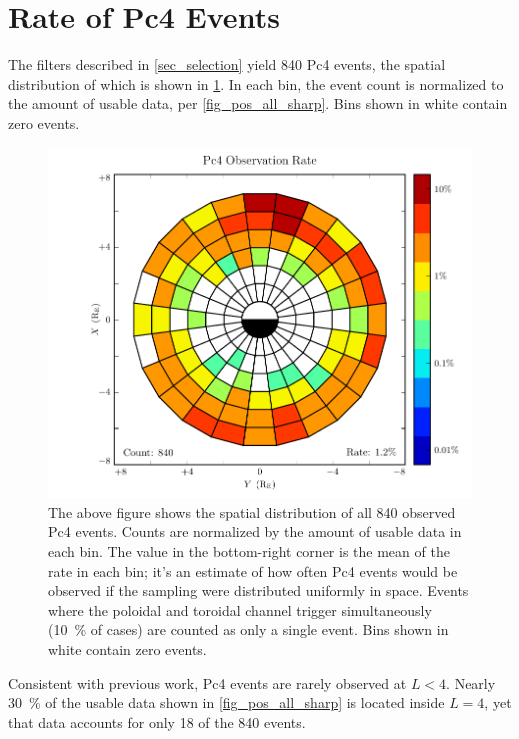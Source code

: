 \section{Rate of Pc4 Events}
  \label{sec_rate}

The filters described in \cref{sec_selection} yield 840 Pc4 events, the spatial distribution of which is shown in \cref{fig_rate_all_sharp}. In each bin, the event count is normalized to the amount of usable data, per \cref{fig_pos_all_sharp}. Bins shown in white contain zero events. 

\begin{figure}[!htb]
    \centering
    \includegraphics[width=\textwidth]{figures/rate_all_sharp.pdf}
    \caption[Observation Rate of Pc4 Events]{
      The above figure shows the spatial distribution of all 840 observed Pc4 events. Counts are normalized by the amount of usable data in each bin. The value in the bottom-right corner is the mean of the rate in each bin; it's an estimate of how often Pc4 events would be observed if the sampling were distributed uniformly in space. Events where the poloidal and toroidal channel trigger simultaneously (\about\SI{10}{\percent} of cases) are counted as only a single event. Bins shown in white contain zero events. 
    }
    \label{fig_rate_all_sharp}
\end{figure}

Consistent with previous work, Pc4 events are rarely observed at $L < 4$. Nearly \SI{30}{\percent} of the usable data shown in \cref{fig_pos_all_sharp} is located inside $L = 4$, yet that data accounts for only 18 of the 840 events. 

